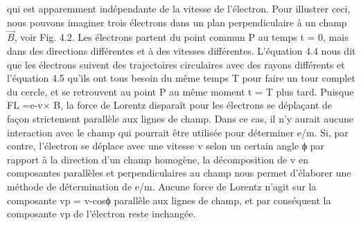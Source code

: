 \documentclass[../main.tex]{subfiles}
\begin{document}
qui est apparemment indépendante de la vitesse de l'électron. Pour illustrer ceci, nous pouvons imaginer trois électrons dans un plan perpendiculaire à un champ $\overrightarrow{B}$, voir Fig. 4.2. Les électrons partent du point commun P au temps t = 0, mais dans des directions différentes et à des vitesses différentes. L'équation 4.4 nous dit que les électrons suivent des trajectoires circulaires avec des rayons différents et l'équation 4.5 qu'ils ont tous besoin du même temps T pour faire un tour complet du cercle, et se retrouvent au point P au même moment t = T plus tard. Puisque FL =e-v× B, la force de Lorentz disparaît pour les électrons se déplaçant de façon strictement parallèle aux lignes de champ. Dans ce cas, il n'y aurait aucune interaction avec le champ qui pourrait être utilisée pour déterminer e/m. Si, par contre, l'électron se déplace avec une vitesse v selon un certain angle ϕ par rapport à la direction d'un champ homogène, la décomposition de v en composantes parallèles et perpendiculaires au champ nous permet d'élaborer une méthode de détermination de e/m. Aucune force de Lorentz n'agit sur la composante vp = v-cosϕ parallèle aux lignes de champ, et par conséquent la composante vp de l'électron reste inchangée.
\end{document}
